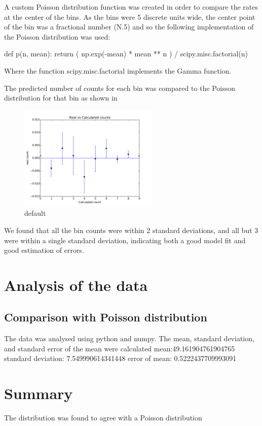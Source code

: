 \documentclass[10pt]{iopart}
\begin{document}
A custom Poisson distribution function was created in order to compare the rates at the center of the bins. As the bins were 5 discrete units wide, the center point of the bin was a fractional number (N.5) and so the following implementation of the Poisson distribution was used:

def p(n, mean):
	return ( np.exp(-mean) * mean ** n ) / scipy.misc.factorial(n)

Where the function scipy.misc.factorial implements the Gamma function.

The predicted number of counts for each bin was compared to the Poisson distribution for that bin as shown in \begin{figure}[htbp]
\begin{center}
\includegraphics[height=5cm]{errorcomp.pdf}
\caption{default}
\label{default}
\end{center}
\end{figure}
 We found that all the bin counts were within 2 standard deviations, and all but 3 were within a single standard deviation, indicating both a good model fit and good estimation of errors.


\section{Analysis of the data}

\subsection{Comparison with Poisson distribution}

The data was analysed using python and numpy. The mean, standard deviation, and standard error of the mean were calculated
mean:49.161904761904765
standard deviation: 7.549990614341448
error of mean: 0.5222437709993091

    
\section{Summary}

The distribution was found to agree with a Poisson distribution 

\printbibheading
\printbibliography
\end{document}
